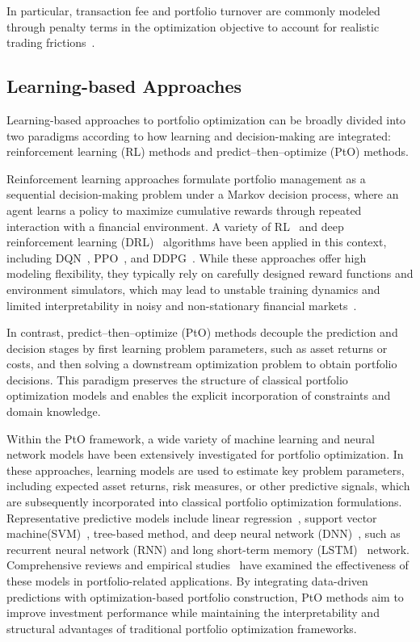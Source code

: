 \documentclass[review]{elsarticle}
\begin{document}
In particular, transaction fee and portfolio turnover are commonly modeled
through penalty terms in the optimization objective to account for realistic
trading frictions~\cite{Boyd2017MultiPeriodTV}.

\subsection{Learning-based Approaches}

Learning-based approaches to portfolio optimization can be broadly divided into two paradigms according to how learning and decision-making are integrated: reinforcement learning (RL) methods and predict--then--optimize (PtO) methods. 

Reinforcement learning approaches formulate portfolio management as a sequential decision-making problem under a Markov decision process, where an agent learns a policy to maximize cumulative rewards through repeated interaction with a financial environment. A variety of RL~\cite{J.Moody2001ReccurentRL} and deep reinforcement learning (DRL)~\cite{Jiang2017DRL} algorithms have been applied in this context, including DQN~\cite{Pigorsch2022DQL}, PPO~\cite{Liu2024PPO}, and DDPG~\cite{Deng2017RepresentDRL}. While these approaches offer high modeling flexibility, they typically rely on carefully designed reward functions and environment simulators, which may lead to unstable training dynamics and limited interpretability in noisy and non-stationary financial markets~\cite{Bai2025RLReview}.

In contrast, predict--then--optimize (PtO) methods decouple the prediction and decision stages by first learning problem parameters, such as asset returns or costs, and then solving a downstream optimization problem to obtain portfolio decisions. This paradigm preserves the structure of classical portfolio optimization models and enables the explicit incorporation of constraints and domain knowledge.

Within the PtO framework, a wide variety of machine learning and neural network models have been extensively investigated for portfolio optimization. In these approaches, learning models are used to estimate key problem parameters, including expected asset returns, risk measures, or other predictive signals, which are subsequently incorporated into classical portfolio optimization formulations. Representative predictive models include linear regression~\cite{DengMin2013LinearforPtO}, support vector machine(SVM)~\cite{PAIVA2019SVMforPtO}, tree-based method, and deep neural network (DNN)~\cite{Freitas2009PredictionBasedPtO}, such as recurrent neural network (RNN) and long short-term memory (LSTM)~\cite{WANG202011LSTMforPtO} network. Comprehensive reviews and empirical studies ~\cite{KRAUSS2017Review1, MA2021Review2}have examined the effectiveness of these models in portfolio-related applications. By integrating data-driven predictions with optimization-based portfolio construction, PtO methods aim to improve investment performance while maintaining the interpretability and structural advantages of traditional portfolio optimization frameworks.
\end{document}
